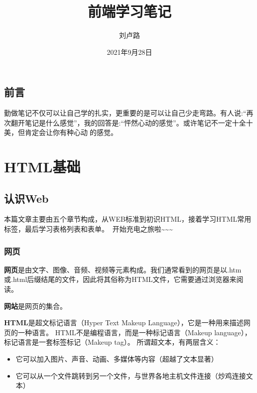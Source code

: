 \documentclass[
]{book}
\title{前端学习笔记}
\author{刘卢路}
\date{2021年9月28日}
\providecommand{\tightlist}{%
  \setlength{\itemsep}{0pt}\setlength{\parskip}{0pt}}
\begin{document}
\maketitle

{
\setcounter{tocdepth}{1}
\tableofcontents
}
\hypertarget{ux524dux8a00}{%
\chapter*{前言}\label{ux524dux8a00}}

勤做笔记不仅可以让自己学的扎实，更重要的是可以让自己少走弯路。有人说:``再次翻开笔记是什么感觉''，我的回答是:``怦然心动的感觉''。或许笔记不一定十全十美，但肯定会让你有种心动💖的感觉。

\hypertarget{part-htmlux57faux7840}{%
\part{HTML基础}\label{part-htmlux57faux7840}}

\hypertarget{ux8ba4ux8bc6web}{%
\chapter{认识Web}\label{ux8ba4ux8bc6web}}

本篇文章主要由五个章节构成，从WEB标准到初识HTML，接着学习HTML常用标签，最后学习表格列表和表单。💪💪开始充电之旅啦\textasciitilde\textasciitilde\textasciitilde{}

\hypertarget{ux7f51ux9875}{%
\section{网页}\label{ux7f51ux9875}}

\textbf{网页}是由文字、图像、音频、视频等元素构成。我们通常看到的网页是以.htm或.html后缀结尾的文件，因此将其俗称为HTML文件，它需要通过浏览器来阅读。

\textbf{网站}是网页的集合。

\textbf{HTML}是超文标记语言（Hyper Text Makeup Language），它是一种用来描述网页的一种语言。
HTML不是编程语言，而是一种标记语言（Makeup language），标记语言是一套标签标记（Makeup tag）。
所谓超文本，有两层含义：

\begin{itemize}
\tightlist
\item
  它可以加入图片、声音、动画、多媒体等内容（超越了文本显著）
\item
  它可以从一个文件跳转到另一个文件，与世界各地主机文件连接（炒鸡连接文本）
\end{itemize}
\end{document}
